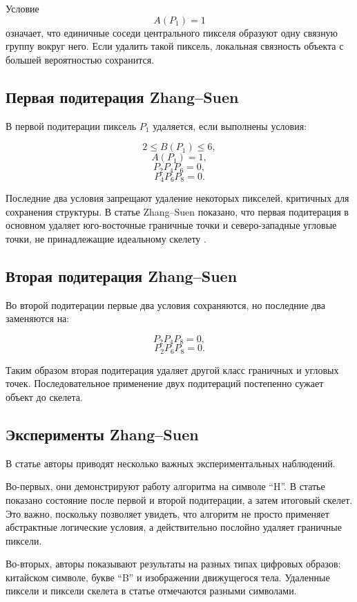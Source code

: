 \documentclass[12pt,a4paper]{article}
\begin{document}
	Условие
	\[
	A(P_1)=1
	\]
	означает, что единичные соседи центрального пикселя образуют одну связную группу вокруг него. Если удалить такой пиксель, локальная связность объекта с большей вероятностью сохранится.
	
	\subsection{Первая подитерация Zhang--Suen}
	
	В первой подитерации пиксель $P_1$ удаляется, если выполнены условия:
	
	\[
	2 \le B(P_1) \le 6,
	\]
	\[
	A(P_1)=1,
	\]
	\[
	P_2P_4P_6=0,
	\]
	\[
	P_4P_6P_8=0.
	\]
	
	Последние два условия запрещают удаление некоторых пикселей, критичных для сохранения структуры. В статье Zhang--Suen показано, что первая подитерация в основном удаляет юго-восточные граничные точки и северо-западные угловые точки, не принадлежащие идеальному скелету \cite{zhang1984}.
	
	\subsection{Вторая подитерация Zhang--Suen}
	
	Во второй подитерации первые два условия сохраняются, но последние два заменяются на:
	
	\[
	P_2P_4P_8=0,
	\]
	\[
	P_2P_6P_8=0.
	\]
	
	Таким образом вторая подитерация удаляет другой класс граничных и угловых точек. Последовательное применение двух подитераций постепенно сужает объект до скелета.
	
	\subsection{Эксперименты Zhang--Suen}
	
	В статье \cite{zhang1984} авторы приводят несколько важных экспериментальных наблюдений.
	
	Во-первых, они демонстрируют работу алгоритма на символе ``H''. В статье показано состояние после первой и второй подитерации, а затем итоговый скелет. Это важно, поскольку позволяет увидеть, что алгоритм не просто применяет абстрактные логические условия, а действительно послойно удаляет граничные пиксели.
	
	Во-вторых, авторы показывают результаты на разных типах цифровых образов: китайском символе, букве ``B'' и изображении движущегося тела. Удаленные пиксели и пиксели скелета в статье отмечаются разными символами.
	
\end{document}
